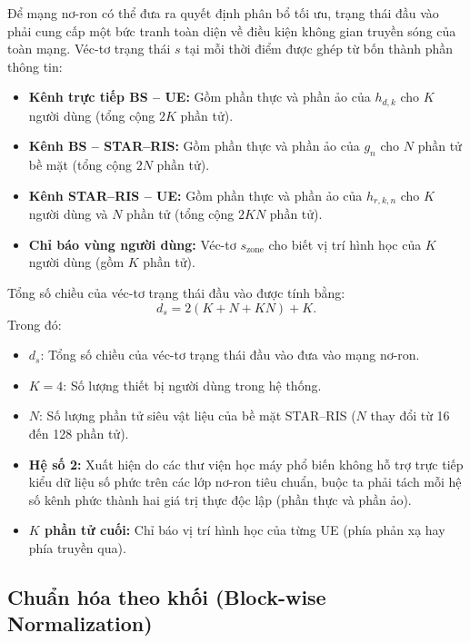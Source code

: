 Để mạng nơ-ron có thể đưa ra quyết định phân bổ tối ưu, trạng thái đầu vào phải cung cấp một bức tranh toàn
diện về điều kiện không gian truyền sóng của toàn mạng. Véc-tơ trạng thái $s$ tại mỗi thời điểm được ghép từ
bốn thành phần thông tin:
\begin{itemize}
\item \textbf{Kênh trực tiếp BS -- UE:} Gồm phần thực và phần ảo của $h_{d,k}$ cho $K$ người dùng (tổng cộng
  $2K$ phần tử).
\item \textbf{Kênh BS -- STAR--RIS:} Gồm phần thực và phần ảo của $g_n$ cho $N$ phần tử bề mặt (tổng cộng $2N$
  phần tử).
\item \textbf{Kênh STAR--RIS -- UE:} Gồm phần thực và phần ảo của $h_{r,k,n}$ cho $K$ người dùng và $N$ phần tử
  (tổng cộng $2KN$ phần tử).
\item \textbf{Chỉ báo vùng người dùng:} Véc-tơ $s_{\mathrm{zone}}$ cho biết vị trí hình học của $K$ người dùng
  (gồm $K$ phần tử).
\end{itemize}
Tổng số chiều của véc-tơ trạng thái đầu vào được tính bằng:
\begin{equation}
d_s = 2(K + N + KN) + K .
\label{eq:so-chieu-trang-thai}
\end{equation}
Trong đó:
\begin{itemize}
\item $d_s$: Tổng số chiều của véc-tơ trạng thái đầu vào đưa vào mạng nơ-ron.
\item $K = 4$: Số lượng thiết bị người dùng trong hệ thống.
\item $N$: Số lượng phần tử siêu vật liệu của bề mặt STAR--RIS ($N$ thay đổi từ 16 đến 128 phần tử).
\item \textbf{Hệ số 2:} Xuất hiện do các thư viện học máy phổ biến không hỗ trợ trực tiếp kiểu dữ liệu số phức
  trên các lớp nơ-ron tiêu chuẩn, buộc ta phải tách mỗi hệ số kênh phức thành hai giá trị thực độc lập (phần
  thực và phần ảo).
\item \textbf{$K$ phần tử cuối:} Chỉ báo vị trí hình học của từng UE (phía phản xạ hay phía truyền qua).
\end{itemize}

\subsection{Chuẩn hóa theo khối (Block-wise Normalization)}
\label{ssec:chuan-hoa-khoi}

